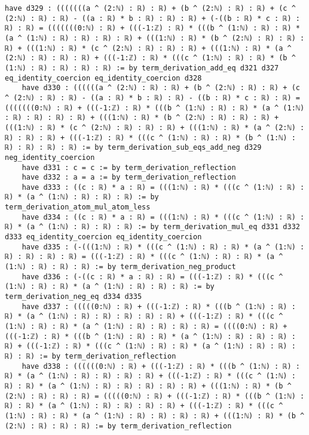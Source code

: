 \documentclass{article}
\begin{document}
\begin{tcolorbox}[colback=white!10, width=\linewidth]
\begin{lstlisting}[language=Lean4]
    have d329 : (((((((a ^ (2:ℕ) : ℝ) : ℝ) + (b ^ (2:ℕ) : ℝ) : ℝ) + (c ^ (2:ℕ) : ℝ) : ℝ) - ((a : ℝ) * b : ℝ) : ℝ) : ℝ) + (-((b : ℝ) * c : ℝ) : ℝ) : ℝ) = (((((((0:ℕ) : ℝ) + (((-1:ℤ) : ℝ) * (((b ^ (1:ℕ) : ℝ) : ℝ) * (a ^ (1:ℕ) : ℝ) : ℝ) : ℝ) : ℝ) + (((1:ℕ) : ℝ) * (b ^ (2:ℕ) : ℝ) : ℝ) : ℝ) + (((1:ℕ) : ℝ) * (c ^ (2:ℕ) : ℝ) : ℝ) : ℝ) + (((1:ℕ) : ℝ) * (a ^ (2:ℕ) : ℝ) : ℝ) : ℝ) + (((-1:ℤ) : ℝ) * (((c ^ (1:ℕ) : ℝ) : ℝ) * (b ^ (1:ℕ) : ℝ) : ℝ) : ℝ) : ℝ) := by term_derivation_add_eq d321 d327 eq_identity_coercion eq_identity_coercion d328
    have d330 : ((((((a ^ (2:ℕ) : ℝ) : ℝ) + (b ^ (2:ℕ) : ℝ) : ℝ) + (c ^ (2:ℕ) : ℝ) : ℝ) - ((a : ℝ) * b : ℝ) : ℝ) - ((b : ℝ) * c : ℝ) : ℝ) = (((((((0:ℕ) : ℝ) + (((-1:ℤ) : ℝ) * (((b ^ (1:ℕ) : ℝ) : ℝ) * (a ^ (1:ℕ) : ℝ) : ℝ) : ℝ) : ℝ) + (((1:ℕ) : ℝ) * (b ^ (2:ℕ) : ℝ) : ℝ) : ℝ) + (((1:ℕ) : ℝ) * (c ^ (2:ℕ) : ℝ) : ℝ) : ℝ) + (((1:ℕ) : ℝ) * (a ^ (2:ℕ) : ℝ) : ℝ) : ℝ) + (((-1:ℤ) : ℝ) * (((c ^ (1:ℕ) : ℝ) : ℝ) * (b ^ (1:ℕ) : ℝ) : ℝ) : ℝ) : ℝ) := by term_derivation_sub_eqs_add_neg d329 neg_identity_coercion
    have d331 : c = c := by term_derivation_reflection
    have d332 : a = a := by term_derivation_reflection
    have d333 : ((c : ℝ) * a : ℝ) = (((1:ℕ) : ℝ) * (((c ^ (1:ℕ) : ℝ) : ℝ) * (a ^ (1:ℕ) : ℝ) : ℝ) : ℝ) := by term_derivation_atom_mul_atom_less
    have d334 : ((c : ℝ) * a : ℝ) = (((1:ℕ) : ℝ) * (((c ^ (1:ℕ) : ℝ) : ℝ) * (a ^ (1:ℕ) : ℝ) : ℝ) : ℝ) := by term_derivation_mul_eq d331 d332 d333 eq_identity_coercion eq_identity_coercion
    have d335 : (-(((1:ℕ) : ℝ) * (((c ^ (1:ℕ) : ℝ) : ℝ) * (a ^ (1:ℕ) : ℝ) : ℝ) : ℝ) : ℝ) = (((-1:ℤ) : ℝ) * (((c ^ (1:ℕ) : ℝ) : ℝ) * (a ^ (1:ℕ) : ℝ) : ℝ) : ℝ) := by term_derivation_neg_product
    have d336 : (-((c : ℝ) * a : ℝ) : ℝ) = (((-1:ℤ) : ℝ) * (((c ^ (1:ℕ) : ℝ) : ℝ) * (a ^ (1:ℕ) : ℝ) : ℝ) : ℝ) := by term_derivation_neg_eq d334 d335
    have d337 : (((((0:ℕ) : ℝ) + (((-1:ℤ) : ℝ) * (((b ^ (1:ℕ) : ℝ) : ℝ) * (a ^ (1:ℕ) : ℝ) : ℝ) : ℝ) : ℝ) : ℝ) + (((-1:ℤ) : ℝ) * (((c ^ (1:ℕ) : ℝ) : ℝ) * (a ^ (1:ℕ) : ℝ) : ℝ) : ℝ) : ℝ) = ((((0:ℕ) : ℝ) + (((-1:ℤ) : ℝ) * (((b ^ (1:ℕ) : ℝ) : ℝ) * (a ^ (1:ℕ) : ℝ) : ℝ) : ℝ) : ℝ) + (((-1:ℤ) : ℝ) * (((c ^ (1:ℕ) : ℝ) : ℝ) * (a ^ (1:ℕ) : ℝ) : ℝ) : ℝ) : ℝ) := by term_derivation_reflection
    have d338 : ((((((0:ℕ) : ℝ) + (((-1:ℤ) : ℝ) * (((b ^ (1:ℕ) : ℝ) : ℝ) * (a ^ (1:ℕ) : ℝ) : ℝ) : ℝ) : ℝ) + (((-1:ℤ) : ℝ) * (((c ^ (1:ℕ) : ℝ) : ℝ) * (a ^ (1:ℕ) : ℝ) : ℝ) : ℝ) : ℝ) : ℝ) + (((1:ℕ) : ℝ) * (b ^ (2:ℕ) : ℝ) : ℝ) : ℝ) = (((((0:ℕ) : ℝ) + (((-1:ℤ) : ℝ) * (((b ^ (1:ℕ) : ℝ) : ℝ) * (a ^ (1:ℕ) : ℝ) : ℝ) : ℝ) : ℝ) + (((-1:ℤ) : ℝ) * (((c ^ (1:ℕ) : ℝ) : ℝ) * (a ^ (1:ℕ) : ℝ) : ℝ) : ℝ) : ℝ) + (((1:ℕ) : ℝ) * (b ^ (2:ℕ) : ℝ) : ℝ) : ℝ) := by term_derivation_reflection

\end{lstlisting}
\end{tcolorbox}
\end{document}

